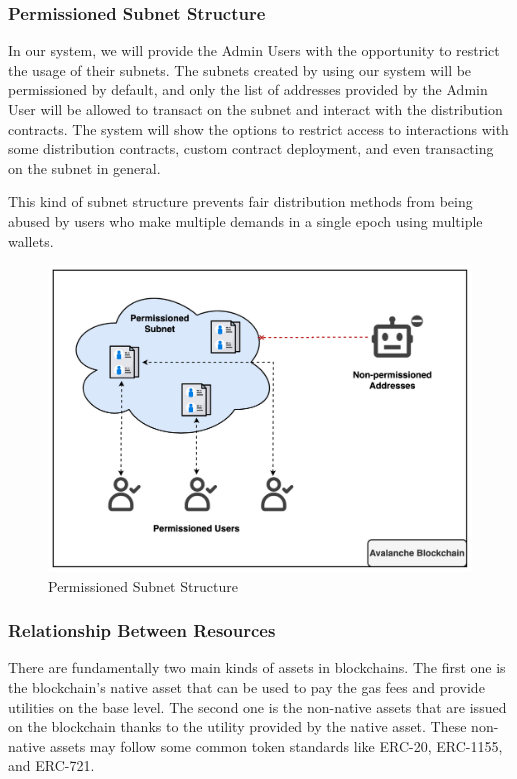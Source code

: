\documentclass[a4paper,12pt]{report}
\begin{document}
\subsubsection{Permissioned Subnet Structure}
In our system, we will provide the Admin Users with the opportunity to restrict the usage of their subnets. The subnets created by using our system will be permissioned by default, and only the list of addresses provided by the Admin User will be allowed to transact on the subnet and interact with the distribution contracts. The system will show the options to restrict access to interactions with some distribution contracts, custom contract deployment, and even transacting on the subnet in general. 

This kind of subnet structure prevents fair distribution methods from being abused by users who make multiple demands in a single epoch using multiple wallets. 

\begin{figure}[H]
	\centering
	\includegraphics[width=1\textwidth]{precompile_1.png}
	\caption{Permissioned Subnet Structure}
\end{figure}

\subsubsection{Relationship Between Resources}
There are fundamentally two main kinds of assets in blockchains. The first one is the blockchain’s native asset that can be used to pay the gas fees and provide utilities on the base level. The second one is the non-native assets that are issued on the blockchain thanks to the utility provided by the native asset. These non-native assets may follow some common token standards like ERC-20, ERC-1155, and ERC-721.
\end{document}
